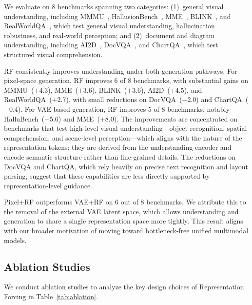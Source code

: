 We evaluate on 8 benchmarks spanning two categories: (1)~general visual understanding, including MMMU~\cite{mmmu}, HallusionBench~\cite{hallubench}, MME~\cite{mme}, BLINK~\cite{blink}, and RealWorldQA~\cite{rwqa}, which test general visual understanding, hallucination robustness, and real-world perception; and (2)~document and diagram understanding, including AI2D~\cite{ai2d}, DocVQA~\cite{docvqa}, and ChartQA~\cite{chartqa}, which test structured visual comprehension.

RF consistently improves understanding under both generation pathways. For pixel-space generation, RF improves 6 of 8 benchmarks, with substantial gains on MMMU~($+4.3$), MME~($+3.6$), BLINK~($+3.6$), AI2D~($+4.5$), and RealWorldQA~($+2.7$), with small reductions on DocVQA~($-2.0$) and ChartQA~($-0.4$). For VAE-based generation, RF improves 5 of 8 benchmarks, notably HalluBench~($+5.6$) and MME~($+8.0$). The improvements are concentrated on benchmarks that test high-level visual understanding---object recognition, spatial comprehension, and scene-level perception---which aligns with the nature of the representation tokens: they are derived from the understanding encoder and encode semantic structure rather than fine-grained details. The reductions on DocVQA and ChartQA, which rely heavily on precise text recognition and layout parsing, suggest that these capabilities are less directly supported by representation-level guidance.

Pixel+RF outperforms VAE+RF on 6 out of 8 benchmarks. We attribute this to the removal of the external VAE latent space, which allows understanding and generation to share a single representation space more tightly. This result aligns with our broader motivation of moving toward bottleneck-free unified multimodal models.



\subsection{Ablation Studies}
\label{sec:ablation}

We conduct ablation studies to analyze the key design choices of Representation Forcing in Table~\ref{tab:ablation}.





